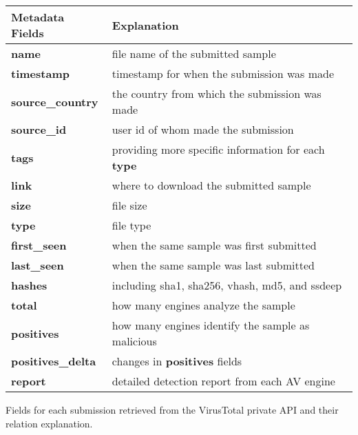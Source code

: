 \begin{table}[h!]
\centering
\footnotesize
{
\begin{tabular}{l|l}
\hline
Metadata Fields & Explanation \\
\hline                            
{\bf name}      & file name of the submitted sample \\
{\bf timestamp} & timestamp for when the submission was made \\
{\bf source\_country} & the country from which the submission was made \\
{\bf source\_id} & user id of whom made the submission\\
{\bf tags} & providing more specific information for each {\bf type}\\
{\bf link} & where to download the submitted sample \\
{\bf size} & file size \\
{\bf type} & file type \\
{\bf first\_seen} & when the same sample was first submitted \\
{\bf last\_seen} & when the same sample was last submitted \\
{\bf hashes} & including sha1, sha256, vhash, md5, and ssdeep\\
{\bf total} & how many engines analyze the sample\\
{\bf positives} & how many engines identify the sample as malicious \\
{\bf positives\_delta} & changes in {\bf positives} fields \\
{\bf report} & detailed detection report from each AV engine \\
\hline

\end{tabular}
}
{ 
Fields for each submission retrieved from the VirusTotal private API and their relation explanation.
}
\end{table}


